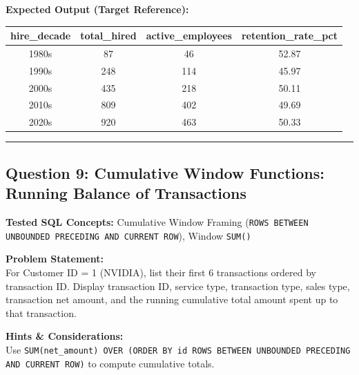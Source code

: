 \documentclass[11pt,a4paper]{article}
\begin{document}
\vspace{0.3cm}
\noindent\textbf{Expected Output (Target Reference):}
\begin{center}
\small
\begin{tabular}{cccc}
\toprule
\textbf{hire\_decade} & \textbf{total\_hired} & \textbf{active\_employees} & \textbf{retention\_rate\_pct} \\
\midrule
1980s & 87 & 46 & 52.87 \\
1990s & 248 & 114 & 45.97 \\
2000s & 435 & 218 & 50.11 \\
2010s & 809 & 402 & 49.69 \\
2020s & 920 & 463 & 50.33 \\
\bottomrule
\end{tabular}
\end{center}

\vspace{0.4cm}
\noindent\rule{\textwidth}{0.4pt}
\vspace{0.4cm}

\subsection*{Question 9: Cumulative Window Functions: Running Balance of Transactions}

\noindent\textbf{Tested SQL Concepts:} Cumulative Window Framing (\texttt{ROWS BETWEEN UNBOUNDED PRECEDING AND CURRENT ROW}), Window \texttt{SUM()}

\vspace{0.15cm}
\noindent\textbf{Problem Statement:} \\
For Customer ID = 1 (NVIDIA), list their first 6 transactions ordered by transaction ID. Display transaction ID, service type, transaction type, sales type, transaction net amount, and the running cumulative total amount spent up to that transaction.

\vspace{0.2cm}
\noindent\textbf{Hints \& Considerations:} \\
Use \texttt{SUM(net\_amount) OVER (ORDER BY id ROWS BETWEEN UNBOUNDED PRECEDING AND CURRENT ROW)} to compute cumulative totals.
\end{document}
